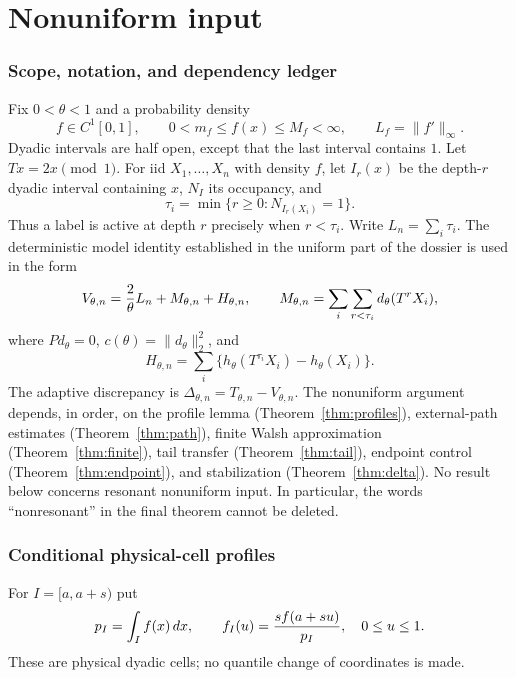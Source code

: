 \documentclass[11pt]{article}
\numberwithin{equation}{section}
\newcommand{\1}{\mathbf 1}\newcommand{\F}{\mathcal F}\newcommand{\D}{\mathcal D}
\newcommand{\norm}[1]{\lVert#1\rVert}
\begin{document}
\part{Nonuniform input}


\section{Scope, notation, and dependency ledger}
Fix $0<\theta<1$ and a probability density
\begin{equation}\label{eq:f-ass}
f\in C^1[0,1],\qquad 0<m_f\le f(x)\le M_f<\infty,
\qquad L_f=\norm{f'}_\infty .
\end{equation}
Dyadic intervals are half open, except that the last interval contains $1$.
Let $T x=2x\pmod 1$.  For iid $X_1,\ldots,X_n$ with density $f$, let
$I_r(x)$ be the depth-$r$ dyadic interval containing $x$, $N_I$ its
occupancy, and
\begin{equation}\label{eq:tau}
 \tau_i=\min\{r\ge0:N_{I_r(X_i)}=1\}.
\end{equation}
Thus a label is active at depth $r$ precisely when $r<\tau_i$.
Write $L_n=\sum_i\tau_i$.  The deterministic model identity established in
the uniform part of the dossier is used in the form
\begin{equation}\label{eq:decomp}
 V_{\theta,n}={2\over\theta}L_n+M_{\theta,n}+H_{\theta,n},\qquad
 M_{\theta,n}=\sum_i\sum_{r<\tau_i}d_\theta(T^rX_i),
\end{equation}
where $P d_\theta=0$, $c(\theta)=\norm{d_\theta}_2^2$, and
\begin{equation}\label{eq:endpoint}
 H_{\theta,n}=\sum_i\{h_\theta(T^{\tau_i}X_i)-h_\theta(X_i)\}.
\end{equation}
The adaptive discrepancy is $\Delta_{\theta,n}=T_{\theta,n}-V_{\theta,n}$.
The nonuniform argument depends, in order, on the profile lemma
(Theorem~\ref{thm:profiles}), external-path estimates
(Theorem~\ref{thm:path}), finite Walsh approximation
(Theorem~\ref{thm:finite}), tail transfer (Theorem~\ref{thm:tail}), endpoint
control (Theorem~\ref{thm:endpoint}), and stabilization
(Theorem~\ref{thm:delta}).  No result below concerns resonant nonuniform
input.  In particular, the words ``nonresonant'' in the final theorem cannot
be deleted.

\section{Conditional physical-cell profiles}
For $I=[a,a+s)$ put
\begin{equation}\label{eq:profile}
p_I=\int_I f(x)\,dx,\qquad f_I(u)={s f(a+su)\over p_I},\quad 0\le u\le1.
\end{equation}
These are physical dyadic cells; no quantile change of coordinates is made.
\end{document}
